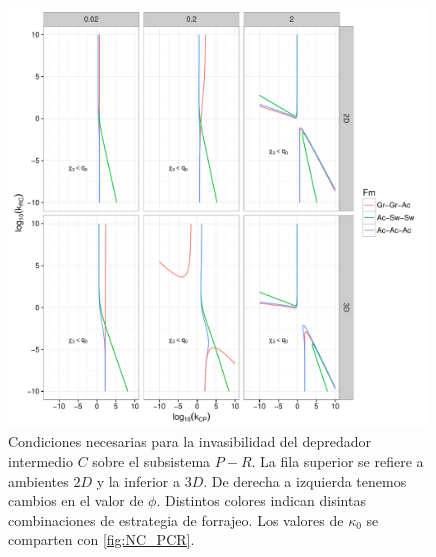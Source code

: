 \begin{figure}[!htbp]
  \centering
  \includegraphics[width = 0.99\textwidth]{./Plots/NecCPR.pdf}
  \caption[Condiciones Necesarias $C \to P-R$]{Condiciones necesarias para la invasibilidad del depredador intermedio $C$ sobre el subsistema $P-R$. La fila superior se refiere a ambientes $2D$ y la inferior a $3D$. De derecha a izquierda tenemos cambios en el valor de $\phi$. Distintos colores indican disintas combinaciones de estrategia de forrajeo. Los valores de $\kappa_0$ se comparten con \ref{fig:NC_PCR}.}
  \label{fig:NC_CPR}
\end{figure}

